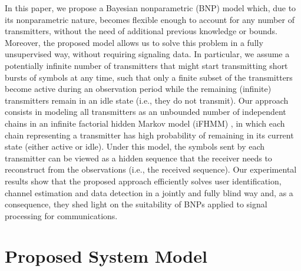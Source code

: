 \documentclass[a4paper]{article}
\begin{document}
In this paper, we propose a Bayesian nonparametric (BNP) model which, due to its nonparametric nature, becomes flexible enough to account for any number of transmitters, without the need of additional previous knowledge or bounds. Moreover, the proposed model allows us to solve this problem in a fully unsupervised way, without requiring signaling data. 
%
In particular, we assume a potentially infinite number of transmitters that might start transmitting short bursts of symbols at any time, such that only a finite subset of the transmitters become active during an observation period while the remaining (infinite) transmitters remain in an idle state (i.e., they do not transmit). 
%
Our approach consists in modeling all transmitters as an unbounded number of independent chains in an infinite factorial hidden Markov model (iFHMM) \cite{IFHMM}, in which each chain representing a transmitter has high probability of remaining in its current state (either active or idle). Under this model, the symbols sent by each transmitter can be viewed as a hidden sequence that the receiver needs to reconstruct from the observations (i.e., the received sequence). 
%
Our experimental results show that the proposed approach efficiently  solves user identification, channel estimation and
data detection in a jointly and fully blind way and, as a consequence, they shed light on the suitability of BNPs applied to signal processing for communications.






\section{Proposed System Model}
\label{sec:approach}
\end{document}
